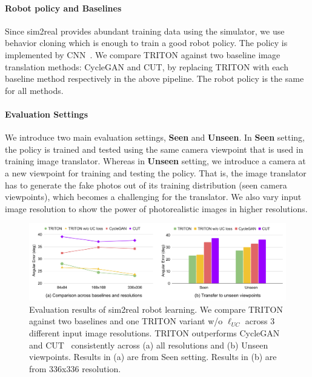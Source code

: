 \documentclass{article}
\begin{document}
\paragraph{Robot policy and Baselines}
Since sim2real provides abundant training data using the simulator, we use behavior cloning which is enough to train a good robot policy.
The policy is implemented by CNN~\cite{dqn}.
We compare TRITON against two baseline image translation methods: CycleGAN and CUT, by replacing TRITON with each baseline method respectively in the above pipeline. The robot policy is the same for all methods.

\paragraph{Evaluation Settings} We introduce two main evaluation settings, \textbf{Seen} and \textbf{Unseen}. In \textbf{Seen} setting, the policy is trained and tested using the same camera viewpoint that is used in training image translator. Whereas in \textbf{Unseen} setting, we introduce a camera at a new viewpoint for training and testing the policy. That is, the image translator has to generate the fake photos out of its training distribution (seen camera viewpoints), which becomes a challenging for the translator. We also vary input image resolution to show the power of photorealistic images in higher resolutions.

\begin{figure}[tbhp]
    \centering
    \vspace{-8pt}
    \includegraphics[width=\textwidth]{images/sim2real_res.pdf}
    \vspace{-20pt}
    \caption{Evaluation results of sim2real robot learning. We compare TRITON against two baselines and one TRITON variant w/o $\ell_{UC}$ across 3 different input image resolutions. TRITON outperforms CycleGAN~\cite{} and CUT~\cite{} consistently across (a) all resolutions and (b) Unseen viewpoints. Results in (a) are from Seen setting. Results in (b) are from 336x336 resolution. }
    \label{fig:sim2real}
    \vspace{-8pt}
\end{figure}
\end{document}
